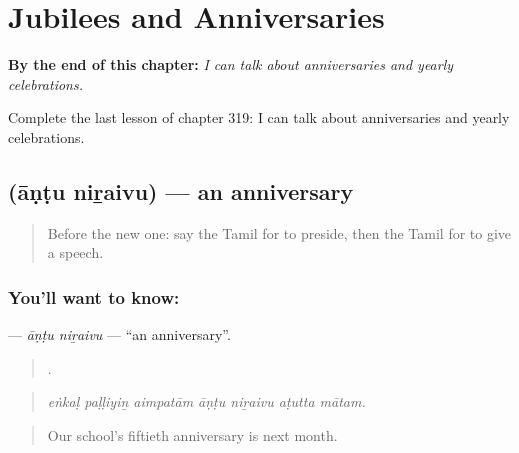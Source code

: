 
\chapter{Jubilees and Anniversaries}
\label{ch:ta-jubilees-and-anniversaries}

\begin{chapteropening}
\textbf{By the end of this chapter:} \emph{I can talk about anniversaries and yearly celebrations.}

Complete the last lesson of chapter 319: I can talk about anniversaries and yearly celebrations.
\end{chapteropening}

\section[\texorpdfstring{\ta{ஆண்டு} \ta{நிறைவு} (āṇṭu niṟaivu)}{ஆண்டு நிறைவு (āṇṭu niṟaivu)}]{  (āṇṭu niṟaivu) — an anniversary}

\label{lesson:TA-C319-antu-niraivu}



\begin{quote}
Before the new one: say the Tamil for to preside, then the Tamil for to give a speech.
\end{quote}

\subsection*{You'll want to know:  }
\textbf{ } — \emph{āṇṭu niṟaivu} — \textquotedblleft{}an anniversary\textquotedblright{}.

\begin{quote}
      .
\end{quote}

\begin{quote}
\emph{eṅkaḷ paḷḷiyiṉ aimpatām āṇṭu niṟaivu aṭutta mātam.}
\end{quote}

\begin{quote}
Our school's fiftieth anniversary is next month.
\end{quote}

